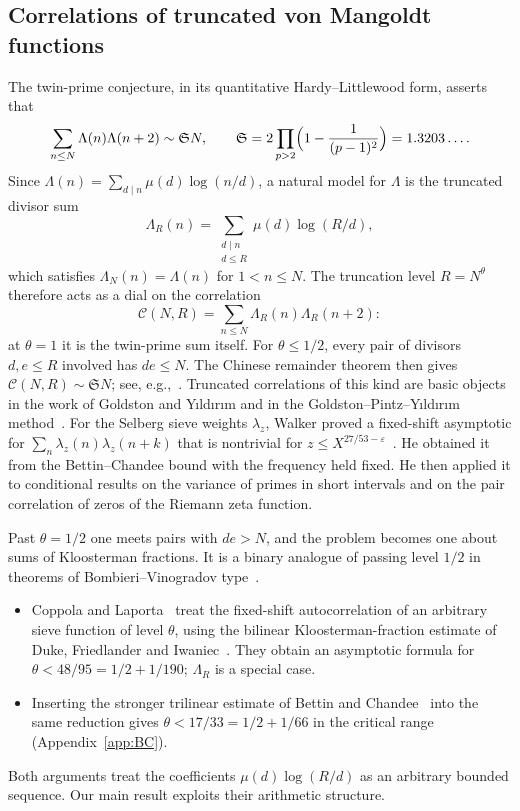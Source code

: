 \documentclass[11pt]{amsart}
\theoremstyle{definition}
\theoremstyle{remark}
\numberwithin{equation}{section}
\newcommand{\eps}{\varepsilon}
\begin{document}
\subsection{Correlations of truncated von Mangoldt functions}
The twin-prime conjecture, in its quantitative Hardy--Littlewood form,
asserts that
\[
 \sum_{n\le N}\Lambda(n)\Lambda(n+2)\sim\mathfrak S N,
 \qquad
 \mathfrak S=2\prod_{p>2}\Bigl(1-\frac1{(p-1)^2}\Bigr)=1.3203\ldots.
\]
Since $\Lambda(n)=\sum_{d\mid n}\mu(d)\log(n/d)$, a natural model for
$\Lambda$ is the truncated divisor sum
\[
 \Lambda_R(n)=\sum_{\substack{d\mid n\\ d\le R}}\mu(d)\log(R/d),
\]
which satisfies $\Lambda_N(n)=\Lambda(n)$ for $1<n\le N$.  The truncation
level $R=N^\theta$ therefore acts as a dial on the correlation
\[
 \mathcal C(N,R)=\sum_{n\le N}\Lambda_R(n)\Lambda_R(n+2):
\]
at $\theta=1$ it is the twin-prime sum itself.  For $\theta\le1/2$, every
pair of divisors $d,e\le R$ involved has $de\le N$.  The Chinese remainder
theorem then gives $\mathcal C(N,R)\sim\mathfrak SN$; see, e.g.,~\cite{GY}.
Truncated correlations of this kind are basic objects in the work of
Goldston and Y\i ld\i r\i m and in the Goldston--Pintz--Y\i ld\i r\i m
method~\cite{GY,GPY}.  For the Selberg sieve weights $\lambda_z$, Walker
proved a fixed-shift asymptotic for $\sum_n\lambda_z(n)\lambda_z(n+k)$ that is
nontrivial for $z\le X^{27/53-\eps}$~\cite{Walker}.  He obtained it from the
Bettin--Chandee bound with the frequency held fixed.  He then applied it to
conditional results on the variance of primes in short intervals and on the
pair correlation of zeros of the Riemann zeta function.

Past $\theta=1/2$ one meets pairs with $de>N$, and the problem becomes one
about sums of Kloosterman fractions.  It is a binary analogue of passing
level $1/2$ in theorems of Bombieri--Vinogradov type~\cite{BFI}.
\begin{itemize}
\item Coppola and Laporta~\cite{CL} treat the fixed-shift autocorrelation of
an arbitrary sieve function of level $\theta$, using the bilinear
Kloosterman-fraction estimate of Duke, Friedlander and Iwaniec~\cite{DFI}.
They obtain an asymptotic formula for $\theta<48/95=1/2+1/190$; $\Lambda_R$
is a special case.
\item Inserting the stronger trilinear estimate of Bettin and
Chandee~\cite{BC} into the same reduction gives
$\theta<17/33=1/2+1/66$ in the critical range (Appendix~\ref{app:BC}).
\end{itemize}
Both arguments treat the coefficients $\mu(d)\log(R/d)$ as an arbitrary
bounded sequence.  Our main result exploits their arithmetic structure.
\end{document}
